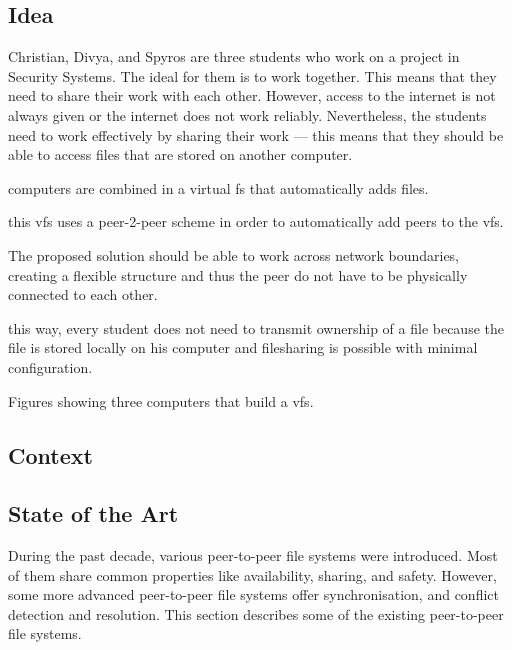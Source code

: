 
\subsection{Idea}

Christian, Divya, and Spyros are three students who work on a project in Security Systems. The ideal for them is to work together. This means that they need to share their work with each other. However, access to the internet is not always given or the internet does not work reliably. Nevertheless, the students need to work effectively by sharing their work --- this means that they should be able to access files that are stored on another computer.

computers are combined in a virtual fs that automatically adds files.

this vfs uses a peer-2-peer scheme in order to automatically add peers to the vfs. 

The proposed solution should be able to work across network boundaries, creating a flexible structure and thus the peer do not have to be physically connected to each other. 

this way, every student does not need to transmit ownership of a file because the file is stored locally on his computer and filesharing is possible with minimal configuration. 



Figures showing three computers that build a vfs.


\subsection{Context}

\subsection{State of the Art}

During the past decade, various peer-to-peer file systems were introduced. Most of them share common properties like availability, sharing, and safety. However, some more advanced peer-to-peer file systems offer synchronisation, and conflict detection and resolution. This section describes some of the existing peer-to-peer file systems.

